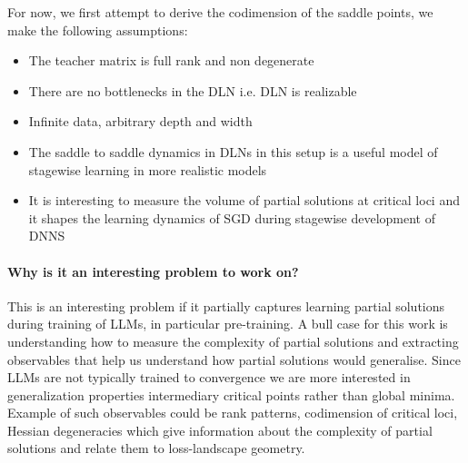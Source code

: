 \documentclass{article}
\theoremstyle{definition}
\begin{document}
For now, we first attempt to derive the codimension of the saddle points, we make the following assumptions:
\begin{itemize}
    \item The teacher matrix is full rank and non degenerate
    \item There are no bottlenecks in the DLN i.e. DLN is realizable
    \item Infinite data, arbitrary depth and width
    \item The saddle to saddle dynamics in DLNs in this setup is a useful model of stagewise learning in more realistic models
    \item It is interesting to measure the volume of partial solutions at critical loci and it shapes the learning dynamics of SGD during stagewise development of DNNS
\end{itemize}
\paragraph{Why is it an interesting problem to work on?} This is an interesting problem if it partially captures learning partial solutions during training of LLMs, in particular pre-training. A bull case for this work is understanding how to measure the complexity of partial solutions and extracting observables that help us understand how partial solutions would generalise. Since LLMs are not typically trained to convergence we are more interested in generalization properties intermediary critical points rather than global minima. Example of such observables could be rank patterns, codimension of critical loci, Hessian degeneracies which give information about the complexity of partial solutions and relate them to loss-landscape geometry.
\end{document}
